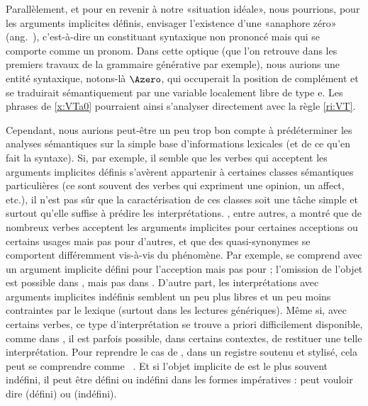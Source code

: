 Parallèlement, et pour en revenir à notre «situation idéale», nous pourrions, pour les arguments implicites définis, envisager l'existence d'une «anaphore zéro» (ang.\ ), c'est-à-dire un constituant syntaxique non prononcé mais qui se comporte comme un pronom. 
Dans cette optique (que l'on retrouve dans les premiers travaux de la grammaire générative par exemple), nous aurions une entité syntaxique, notons-là $\Azero$, qui occuperait la position de complément et se traduirait sémantiquement par une variable localement libre de type \typ e.
Les phrases de  \ref{x:VTa0} pourraient ainsi s'analyser directement avec la règle \ref{ri:VT}.


Cependant, nous aurions peut-être un peu trop bon compte à prédéterminer les analyses sémantiques sur la simple base d'informations lexicales (et de ce qu'en fait la syntaxe).  Si, par exemple, il semble que les verbes qui acceptent les arguments implicites définis s'avèrent appartenir à certaines classes sémantiques particulières (ce sont souvent des verbes qui expriment une opinion, un affect, etc.), il n'est pas sûr que la caractérisation de ces classes soit une tâche simple et surtout qu'elle suffise à prédire les interprétations.  \citet{Fil:86}, entre autres, a montré que de nombreux verbes acceptent les arguments implicites pour certaines acceptions ou certains usages mais pas pour d'autres, et que des quasi-synonymes se comportent différemment vis-à-vis du phénomène.  Par exemple,  se comprend avec un argument implicite défini pour l'acception  mais pas pour  ; l'omission de l'objet est possible dans , mais pas dans \zarb{}.  D'autre part, les interprétations avec arguments implicites indéfinis semblent un peu plus libres et un peu moins contraintes par le lexique (surtout dans les lectures génériques). Même si, avec certains verbes, ce type d'interprétation se trouve {a priori} difficilement disponible, comme dans \zarb{}, il est parfois possible, dans certains contextes, de restituer une telle interprétation.  Pour reprendre le cas de , dans un registre soutenu et stylisé, cela peut se comprendre comme  \ie\ .  
Et si l'objet implicite de  est le plus souvent indéfini, il peut être défini ou indéfini dans les formes impératives :  peut vouloir dire  (défini) ou  (indéfini).
